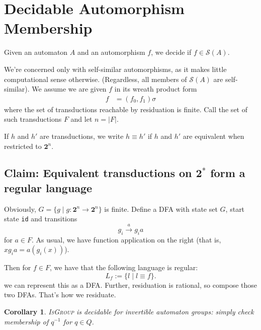 \documentclass[10pt]{article} %
\newtheorem{corollary}{Corollary}
\newcommand{\decprob}[1]{\textsc{#1}}
\begin{document}
    \section{Decidable Automorphism Membership}


    Given an automaton $A$ and an automorphism $f$, we decide if $f \in \mathcal{S}(A)$.

    We're concerned only with self-similar automorphisms, as it makes little computational sense otherwise. (Regardless, all members of $\mathcal{S}(A)$ are self-similar). We assume we are given $f$ in its wreath product form %
    \begin{align*}
    f &= (f_0, f_1)\sigma
    \end{align*}
    where the set of transductions reachable by residuation is finite. Call the set of such transductions $F$ and let $n = |F|$.

    If $h$ and $h'$ are transductions, we write $h \equiv h'$ if $h$ and $h'$ are equivalent when restricted to $\textbf{2}^n$. 

    \subsection*{Claim: Equivalent transductions on $\textbf{2}^*$ form a regular language}

    Obviously, $G = \{ g \mid g : \textbf{2}^n \rightarrow \textbf{2}^n \}$ is finite. Define a DFA with state set $G$, start state \texttt{id} and transitions
    \[
    g_i \stackrel{a}{\longrightarrow} g_i a
    \]
    for $a \in F$. As usual, we have function application on the right (that is, $x g_i a = a(g_i(x))$).

    Then for $f \in F$, we have that the following language is regular:
    \[
    L_{f} := \{l \mid l \equiv f \}.
    \]
    we can represent this as a DFA. Further, residuation is rational, so compose those two DFAs. That's how we residuate.


    \begin{corollary}
    \decprob{IsGroup} is decidable for invertible automaton groups: simply check membership of $q^{-1}$ for $q \in Q$.
    \end{corollary}
\end{document}
